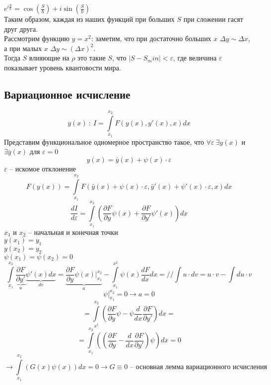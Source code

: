 \documentclass[a4paper, 12pt, titlepage, fleqn]{article}
\newcommand{\T}{\textbf}
\newcommand{\D}{\partial}
\begin{document}
			$e^{i\frac{S}{\hbar}} = \cos(\frac{S}{\hbar}) + i\sin(\frac{S}{\hbar})$\\
			
			Таким образом, каждая из наших функций при больших $S$ при сложении гасят друг друга.\\
			
			Рассмотрим функцию $y = x^2$: заметим, что при достаточно больших $x$ $\Delta y \sim \Delta x$, а при малых $x$ $\Delta y \sim (\Delta x)^2$.\\
			
			Тогда $S$ влияющие на $\rho$ это такие $S$, что $|S - S_min| < \varepsilon$, где величина $\varepsilon$ показывает уровень квантовости мира.
			
		\subsection{Вариационное исчисление}
			\[
				y(x) \: \colon\: I = \int\limits_{x_1}^{x_2} F(y(x), y'(x), x)dx
			\] 
			Представим функциональное одномерное пространство такое, что $\forall \varepsilon\: \exists y(x)$ и $\exists \bar{y}(x)$ для $\varepsilon = 0$\\
			\[
				y(x) = \bar{y}(x) + \psi(x) \cdot \varepsilon
			\]
			$\varepsilon$ -- искомое отклонение
			\[
				F(y(x)) = \int\limits_{x_1}^{x_2} F(\bar{y}(x) + \psi(x) \cdot \varepsilon, \bar{y}'(x) + \psi'(x) \cdot \varepsilon, x)dx
			\]
			\[
				\frac{dI}{d\varepsilon} = \int\limits_{x_1}^{x_2}(\frac{\partial F}{\partial y}\psi(x) + \frac{\partial F}{\partial y'}\psi'(x))dx
			\]
			$x_1$ и $x_2$ -- начальная и конечная точки\\ 
			$y(x_1) = y_1$ \\
			$y(x_2) = y_2$\\
			$\psi(x_1) = \psi(x_2) = 0$
			\[
				\int\limits_{x_1}^{x_2} \underbrace{\frac{\partial F}{\partial y'}}_u \underbrace{\psi'(x)dx}_{dv} = \underbrace{\frac{\partial F}{\partial y}\psi(x)|_{x_1}^{x_2}}_a - \int\limits_{x_1}^{x^2} \psi(x)\frac{dF}{dx}dx = \T{//} \int u\cdot dv = u \cdot v - \int du \cdot v 
			\]
			\[
				\psi|_{x_1}^{x_2} = 0 \to a = 0 
			\]
			\[
				= \int\limits_{x^1}^{x_2} \left(\frac{\partial F}{\D y} \psi - \psi \frac{d}{dx} \frac{\D F}{\D y'} \right)dx = 
			\]
			\[
				= \int\limits_{x_1}^{x_2} \left( \left(\frac{\D F}{\D y} - \frac{d}{dx} \frac{\D F}{\D y'}\right) \psi \right) dx  = 0
			\]
			\[
				\to \int\limits_{x_1}^{x_2} \left(G\left(x\right) \psi \left(x\right) \right) dx = 0 \to G \equiv 0 \T{ -- основная лемма вариационного исчисления}
			\]
\end{document}
